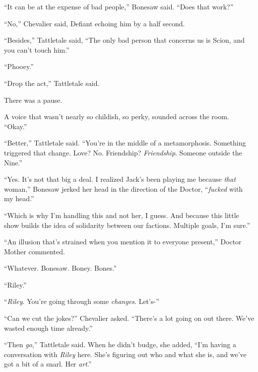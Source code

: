 ``It can be at the expense of bad people,'' Bonesaw said.  ``Does that work?''



``No,'' Chevalier said, Defiant echoing him by a half second.



``Besides,'' Tattletale said, ``The only bad person that concerns us is Scion, and you can't touch him.''



``Phooey.''



``Drop the act,'' Tattletale said.



There was a pause.



A voice that wasn't nearly so childish, so perky, sounded across the room.  ``Okay.''



``Better,'' Tattletale said.  ``You're in the middle of a metamorphosis.  Something triggered that change.  Love?  No.  Friendship?  \emph{Friendship}.  Someone outside the Nine.''



``Yes.  It's not that big a deal.  I realized Jack's been playing me because \emph{that} woman,'' Bonesaw jerked her head in the direction of the Doctor, ``\emph{fucked} with my head.''



``Which is why I'm handling this and not her, I guess.  And because this little show builds the idea of solidarity between our factions.  Multiple goals, I'm sure.''



``An illusion that's strained when you mention it to everyone present,'' Doctor Mother commented.



``Whatever.  Bonesaw.  Boney.  Bones.''



``Riley.''



``\emph{Riley}.  You're going through some \emph{changes}.  Let's-''



``Can we cut the jokes?'' Chevalier asked.  ``There's a lot going on out there.  We've wasted enough time already.''



``Then \emph{go},'' Tattletale said.  When he didn't budge, she added, ``I'm having a conversation with \emph{Riley} here.  She's figuring out who and what she is, and we've got a bit of a snarl.  Her \emph{art}.''




